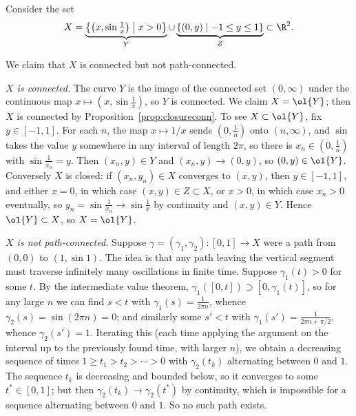 \begin{example}\label{ex:sinecurve}
    Consider the set
    $$
    X = \underbrace{\left\{ \left(x, \sin \tfrac{1}{x}\right) \;\middle|\; x > 0 \right\}}_{Y} \cup \underbrace{\{(0, y) \mid -1 \leq y \leq 1\}}_{Z} \subset \R^2.
    $$

    \begin{center}
    \end{center}

    We claim that $X$ is connected but not path-connected.

    \emph{$X$ is connected.} The curve $Y$ is the image of the connected set $(0, \infty)$ under the continuous map $x \mapsto (x, \sin \frac{1}{x})$, so $Y$ is connected. We claim $X = \ol{Y}$; then $X$ is connected by Proposition~\ref{prop:closureconn}. To see $X \subset \ol{Y}$, fix $y \in [-1, 1]$. For each $n$, the map $x \mapsto 1/x$ sends $(0, \frac{1}{n})$ onto $(n, \infty)$, and $\sin$ takes the value $y$ somewhere in any interval of length $2\pi$, so there is $x_n \in (0, \frac{1}{n})$ with $\sin \frac{1}{x_n} = y$. Then $(x_n, y) \in Y$ and $(x_n, y) \rightarrow (0, y)$, so $(0, y) \in \ol{Y}$. Conversely $X$ is closed: if $(x_n, y_n) \in X$ converges to $(x, y)$, then $y \in [-1, 1]$, and either $x = 0$, in which case $(x, y) \in Z \subset X$, or $x > 0$, in which case $x_n > 0$ eventually, so $y_n = \sin\frac{1}{x_n} \rightarrow \sin \frac{1}{x}$ by continuity and $(x, y) \in Y$. Hence $\ol{Y} \subset X$, so $X = \ol{Y}$.

    \emph{$X$ is not path-connected.} Suppose $\gamma = (\gamma_1, \gamma_2): [0, 1] \rightarrow X$ were a path from $(0, 0)$ to $(1, \sin 1)$. The idea is that any path leaving the vertical segment must traverse infinitely many oscillations in finite time. Suppose $\gamma_1(t) > 0$ for some $t$. By the intermediate value theorem, $\gamma_1([0, t]) \supset [0, \gamma_1(t)]$, so for any large $n$ we can find $s < t$ with $\gamma_1(s) = \frac{1}{2\pi n}$, whence $\gamma_2(s) = \sin(2 \pi n) = 0$; and similarly some $s' < t$ with $\gamma_1(s') = \frac{1}{2\pi n + \pi/2}$, whence $\gamma_2(s') = 1$. Iterating this (each time applying the argument on the interval up to the previously found time, with larger $n$), we obtain a decreasing sequence of times $1 \geq t_1 > t_2 > \cdots > 0$ with $\gamma_2(t_k)$ alternating between $0$ and $1$. The sequence $t_k$ is decreasing and bounded below, so it converges to some $t^* \in [0, 1]$; but then $\gamma_2(t_k) \rightarrow \gamma_2(t^*)$ by continuity, which is impossible for a sequence alternating between $0$ and $1$. So no such path exists.
\end{example}

